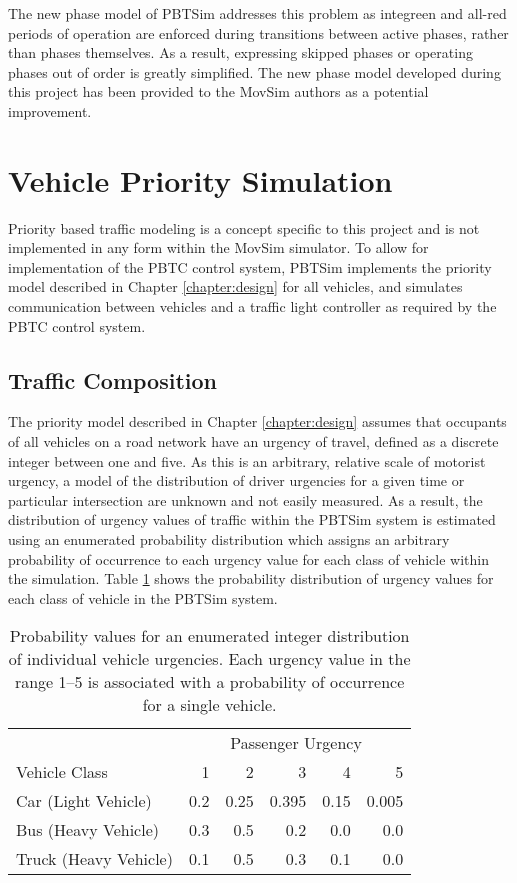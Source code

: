 The new phase model of PBTSim addresses this problem as integreen and all-red periods of operation are enforced during transitions between active phases, rather than phases themselves. As a result, expressing skipped phases or operating phases out of order is greatly simplified. The new phase model developed during this project has been provided to the MovSim authors as a potential improvement.


\section{Vehicle Priority Simulation}

Priority based traffic modeling is a concept specific to this project and is not implemented in any form within the MovSim simulator. To allow for implementation of the PBTC control system, PBTSim implements the priority model described in Chapter \ref{chapter:design} for all vehicles, and simulates communication between vehicles and a traffic light controller as required by the PBTC control system.

\subsection{Traffic Composition}

The priority model described in Chapter \ref{chapter:design} assumes that occupants of all vehicles on a road network have an urgency of travel, defined as a discrete integer between one and five. As this is an arbitrary, relative scale of motorist urgency, a model of the distribution of driver urgencies for a given time or particular intersection are unknown and not easily measured. As a result, the distribution of urgency values of traffic within the PBTSim system is estimated using an enumerated probability distribution which assigns an arbitrary probability of occurrence to each urgency value for each class of vehicle within the simulation. Table \ref{urgencydistribution} shows the probability distribution of urgency values for each class of vehicle in the PBTSim system. 

\begin{table}[]
\begin{center}
\begin{tabular}{lrrrrr}
\toprule
 & \multicolumn{5}{c}{Passenger Urgency} \\
 \cmidrule(lr){2-6}
Vehicle Class & 1 & 2 & 3 & 4 & 5 \\
\midrule
Car (Light Vehicle) & 0.2 & 0.25 & 0.395 & 0.15 & 0.005  \\
Bus (Heavy Vehicle) & 0.3 & 0.5 & 0.2 & 0.0 & 0.0 \\
Truck (Heavy Vehicle) & 0.1 & 0.5 & 0.3 & 0.1 & 0.0 \\
\bottomrule
\end{tabular}
\end{center}
\caption{Probability values for an enumerated integer distribution of individual vehicle urgencies. Each urgency value in the range 1--5 is associated with a probability of occurrence for a single vehicle. }
	\label{urgencydistribution}
\end{table}

